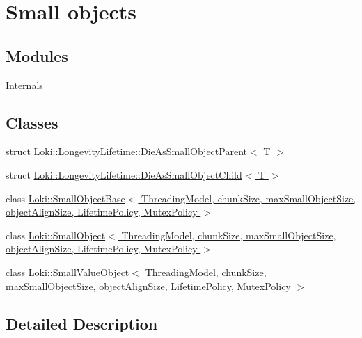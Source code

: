 \hypertarget{group__SmallObjectGroup}{}\section{Small objects}
\label{group__SmallObjectGroup}
\subsection*{Modules}
\begin{DoxyCompactItemize}
\item 
\hyperlink{group__SmallObjectGroupInternal}{Internals}
\end{DoxyCompactItemize}
\subsection*{Classes}
\begin{DoxyCompactItemize}
\item 
struct \hyperlink{structLoki_1_1LongevityLifetime_1_1DieAsSmallObjectParent}{Loki\+::\+Longevity\+Lifetime\+::\+Die\+As\+Small\+Object\+Parent$<$ T $>$}
\item 
struct \hyperlink{structLoki_1_1LongevityLifetime_1_1DieAsSmallObjectChild}{Loki\+::\+Longevity\+Lifetime\+::\+Die\+As\+Small\+Object\+Child$<$ T $>$}
\item 
class \hyperlink{classLoki_1_1SmallObjectBase}{Loki\+::\+Small\+Object\+Base$<$ Threading\+Model, chunk\+Size, max\+Small\+Object\+Size, object\+Align\+Size, Lifetime\+Policy, Mutex\+Policy $>$}
\item 
class \hyperlink{classLoki_1_1SmallObject}{Loki\+::\+Small\+Object$<$ Threading\+Model, chunk\+Size, max\+Small\+Object\+Size, object\+Align\+Size, Lifetime\+Policy, Mutex\+Policy $>$}
\item 
class \hyperlink{classLoki_1_1SmallValueObject}{Loki\+::\+Small\+Value\+Object$<$ Threading\+Model, chunk\+Size, max\+Small\+Object\+Size, object\+Align\+Size, Lifetime\+Policy, Mutex\+Policy $>$}
\end{DoxyCompactItemize}


\subsection{Detailed Description}
